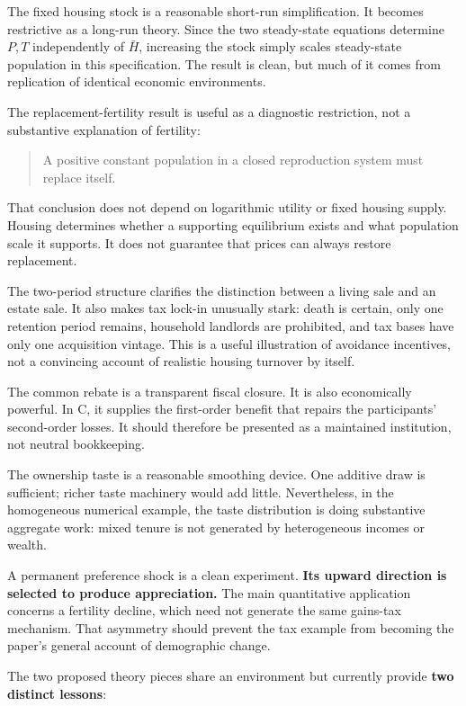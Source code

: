 \documentclass[11pt,letterpaper]{article}
\begin{document}
The fixed housing stock is a reasonable short-run simplification. It becomes restrictive
as a long-run theory. Since the two steady-state equations determine \(P,T\) independently
of \(\bar H\), increasing the stock simply scales steady-state population in this
specification. The result is clean, but much of it comes from replication of identical
economic environments.

The replacement-fertility result is useful as a diagnostic restriction, not a substantive
explanation of fertility:

\begin{quote}
A positive constant population in a closed reproduction system must replace itself.
\end{quote}

That conclusion does not depend on logarithmic utility or fixed housing supply. Housing
determines whether a supporting equilibrium exists and what population scale it supports.
It does not guarantee that prices can always restore replacement.

The two-period structure clarifies the distinction between a living sale and an estate
sale. It also makes tax lock-in unusually stark: death is certain, only one retention
period remains, household landlords are prohibited, and tax bases have only one
acquisition vintage. This is a useful illustration of avoidance incentives, not a
convincing account of realistic housing turnover by itself.

The common rebate is a transparent fiscal closure. It is also economically powerful. In C,
it supplies the first-order benefit that repairs the participants' second-order losses. It
should therefore be presented as a maintained institution, not neutral bookkeeping.

The ownership taste is a reasonable smoothing device. One additive draw is sufficient;
richer taste machinery would add little. Nevertheless, in the homogeneous numerical
example, the taste distribution is doing substantive aggregate work: mixed tenure is not
generated by heterogeneous incomes or wealth.

A permanent preference shock is a clean experiment. \textbf{Its upward direction is
selected to produce appreciation.} The main quantitative application concerns a fertility
decline, which need not generate the same gains-tax mechanism. That asymmetry should
prevent the tax example from becoming the paper's general account of demographic change.

The two proposed theory pieces share an environment but currently provide \textbf{two
distinct lessons}:
\end{document}
